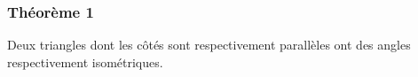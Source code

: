 \documentclass[a4paper,12pt]{article}
\begin{document}
\subsubsection{Théorème 1}
\begin{theorem}
Deux triangles dont les côtés sont respectivement parallèles ont des angles respectivement isométriques.
\end{theorem}
\end{document}

